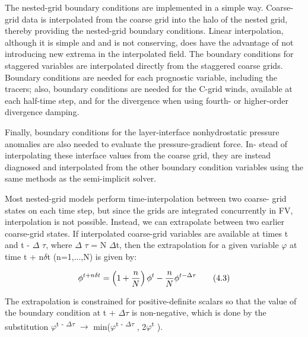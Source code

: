 The nested-\/grid boundary conditions are implemented in a simple way. Coarse-\/grid data is interpolated from the coarse grid into the halo of the nested grid, thereby providing the nested-\/grid boundary conditions. Linear interpolation, although it is simple and and is not conserving, does have the advantage of not introducing new extrema in the interpolated field. The boundary conditions for staggered variables are interpolated directly from the staggered coarse grids. Boundary conditions are needed for each prognostic variable, including the tracers; also, boundary conditions are needed for the C-\/grid winds, available at each half-\/time step, and for the divergence when using fourth-\/ or higher-\/order divergence damping.

Finally, boundary conditions for the layer-\/interface nonhydrostatic pressure anomalies are also needed to evaluate the pressure-\/gradient force. In-\/ stead of interpolating these interface values from the coarse grid, they are instead diagnosed and interpolated from the other boundary condition variables using the same methods as the semi-\/implicit solver.

Most nested-\/grid models perform time-\/interpolation between two coarse-\/ grid states on each time step, but since the grids are integrated concurrently in FV\textthreesuperior{}, interpolation is not possible. Instead, we can extrapolate between two earlier coarse-\/grid states. If interpolated coarse-\/grid variables are available at times t and t -\/ {$\Delta$} {$\tau$}, where {$\Delta$} {$\tau$} = N {$\Delta$}t, then the extrapolation for a given variable {$\varphi$} at time t + n{$\delta$}t (n=1,...,N) is given by\+:

\[ \phi^{t+n\delta t} = \left( 1 + \frac{n}{N} \right) \phi^t - \frac{n}{N} \phi^{t-\Delta \tau} \\ \tag {4.3} \]

The extrapolation is constrained for positive-\/definite scalars so that the value of the boundary condition at t + {$\Delta$}{$\tau$} is non-\/negative, which is done by the substitution {$\varphi$}\textsuperscript{t -\/ {$\Delta$}{$\tau$} } {$\rightarrow$} min({$\varphi$}\textsuperscript{t -\/ {$\Delta$}{$\tau$} }, 2{$\varphi$}\textsuperscript{t} ).

